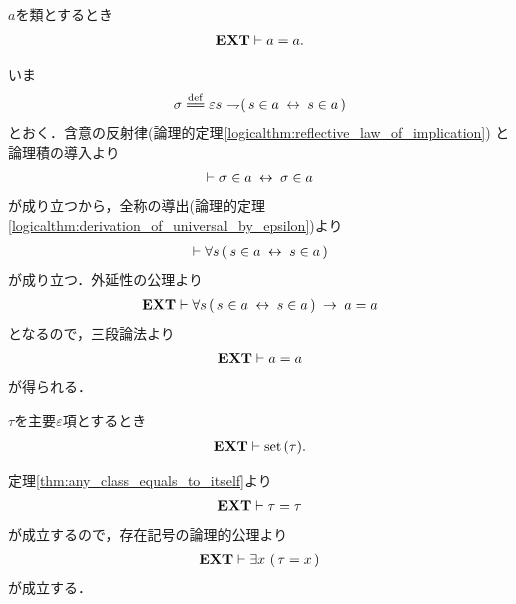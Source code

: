 	\begin{screen}
		\begin{thm}[任意の類は自分自身と等しい]\label{thm:any_class_equals_to_itself}
			$a$を類とするとき
			\begin{align}
				\mbox{{\bf EXT}} \vdash a = a.
			\end{align}
		\end{thm}
	\end{screen}
	
	\begin{sketch}
		いま
		\begin{align}
			\sigma \defeq 
			\varepsilon s \negation (\, s \in a \lrarrow s \in a\, )
		\end{align}
		とおく．含意の反射律(論理的定理\ref{logicalthm:reflective_law_of_implication})
		と論理積の導入より
		\begin{align}
			\vdash \sigma \in a \hspace{0.25em}\leftrightarrow\hspace{0.25em} \sigma \in a
		\end{align}
		が成り立つから，全称の導出(論理的定理\ref{logicalthm:derivation_of_universal_by_epsilon})より
		\begin{align}
			\vdash \forall s\, (\, s \in a  \hspace{0.25em}\leftrightarrow\hspace{0.25em} s \in a\, )
		\end{align}
		が成り立つ．外延性の公理より
		\begin{align}
			\mbox{{\bf EXT}} \vdash \forall s\, (\, s \in a  \hspace{0.25em}\leftrightarrow\hspace{0.25em} s \in a\, )
			\hspace{0.25em}\rightarrow\hspace{0.25em} a = a
		\end{align}
		となるので，三段論法より
		\begin{align}
			\mbox{{\bf EXT}} \vdash a = a
		\end{align}
		が得られる．
		\QED
	\end{sketch}
	
	\begin{screen}
		\begin{thm}
		\label{thm:critical_epsilon_term_is_set}
			$\tau$を主要$\varepsilon$項とするとき
			\begin{align}
				\mbox{{\bf EXT}} \vdash \operatorname*{set}\hspace{0.15em}(\tau).
			\end{align}
		\end{thm}
	\end{screen}
	
	\begin{sketch}
		定理\ref{thm:any_class_equals_to_itself}より
		\begin{align}
			\mbox{{\bf EXT}} \vdash \tau = \tau
		\end{align}
		が成立するので，存在記号の論理的公理より
		\begin{align}
			\mbox{{\bf EXT}} \vdash \exists x\, \left(\, \tau = x\, \right)
		\end{align}
		が成立する．
		\QED
	\end{sketch}
	
